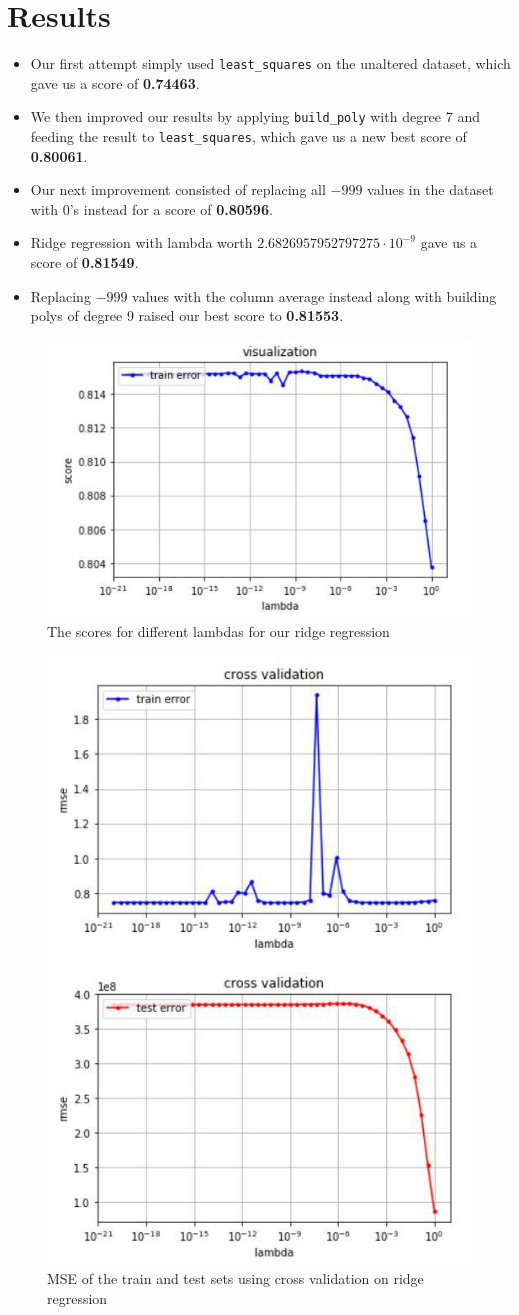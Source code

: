 \documentclass[10pt,conference,compsocconf]{IEEEtran}
\begin{document}
\section{Results}
\begin{itemize}
\item Our first attempt simply used \texttt{least\_squares} on the unaltered dataset, which gave us a score of \textbf{0.74463}.
\item We then improved our results by applying \texttt{build\_poly} with degree 7 and feeding the result to \texttt{least\_squares}, which gave us a new best score of \textbf{0.80061}.
\item Our next improvement  consisted of replacing all $-999$ values in the dataset with 0's instead for a score of \textbf{0.80596}.
\item Ridge regression with lambda worth $2.6826957952797275 \cdot 10^{-9}$ gave us a score of \textbf{0.81549}.
\item Replacing $-999$ values with the column average instead along with building polys of degree 9 raised our best score to \textbf{0.81553}.
\end{itemize}
\begin{figure}[h!]
\includegraphics[width=.5\textwidth]{ridge_reg_scores.jpg}
\caption{The scores for different lambdas for our ridge regression}
\end{figure}
\begin{figure}[h!]
\includegraphics[width=.5\textwidth]{mse_cross_valid.jpg}
\caption{MSE of the train and test sets using cross validation on ridge regression}
\end{figure}
\end{document}
